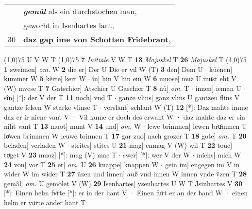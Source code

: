 \documentclass[8pt,a4paper,notitlepage]{article}
\begin{document}
\begin{table}[ht]
\begin{minipage}[t]{0.5\linewidth}
\begin{tabular}{rl}
 & \textit{\textbf{gemâl}} als ein durchstochen man,\\ 
 & geworht in Isenhartes lant,\\ 
30 & \textbf{daz gap ime von Schotten Fridebrant},\\ 
\end{tabular}
\scriptsize
\line(1,0){75} \newline
U V W T \newline
\line(1,0){75} \newline
\textbf{7} \textit{Initiale} V W T  \textbf{13} \textit{Majuskel} T  \textbf{26} \textit{Majuskel} T  \newline
\line(1,0){75} \newline
\textbf{1} sweimen] \textit{om.} W \textbf{2} die er] Der U Die er vil W (T) \textbf{3} den] Dem U  $\cdot$ küenen] kummer W \textbf{5} kêrte] kert W  $\cdot$ în] hin V hin ein W \textbf{6} muose] muͦz U muͤst eht V (W) mvese T \textbf{7} Gatschier] Atschier U Gaschier T \textbf{8} nû] \textit{om.} T  $\cdot$ innen] ieman U  $\cdot$ sîn] [*]: der V der T \textbf{11} noch] vnd T  $\cdot$ ganze vlins] ganz vlins U gantzen flins V gantze felsen W starke vlinse T  $\cdot$ verslant] schlant W (T) \textbf{12} [*]: Daz mahte imme daz er ir niene vant V · Vil kume er doch des erwant W · daz mahte daz er sin niht vant T \textbf{13} muot] munt V \textbf{14} und] \textit{om.} W  $\cdot$ lewe brimmen] lewen bruͦmmen U loͤwen brimmen W leuwe brinnen T \textbf{17} gar zuo] nach grozer T \textbf{18} gote] \textit{om.} T \textbf{20} beladen] verladen W  $\cdot$ strîtes] stites U \textbf{21} mag] enmag V (W) wil T \textbf{22} touc] toͮget V \textbf{23} muoz] [*]: mag (V) mac T  $\cdot$ swer] [*]: wer V der W  $\cdot$ michs] mich W \textbf{24} von] vor T \textbf{25} er] \textit{om.} U \textbf{26} knappe] knappen W  $\cdot$ gein im] engegen im V in wider W im wider T \textbf{27} ûzen und innen] auß vnd innen W innen vnde v̂zen T \textbf{28} gemâl] \textit{om.} U gemolet V (W) \textbf{29} Isenhartes] ysenhartes U W T Jsinhartes V \textbf{30} [*]: Einen helm fvͦrte [*]: er in der hant V · Einen fuͦrt er an der hand W · einen helm er vuͦrte ander hant T \newline
\end{minipage}
\end{table}
\end{document}
